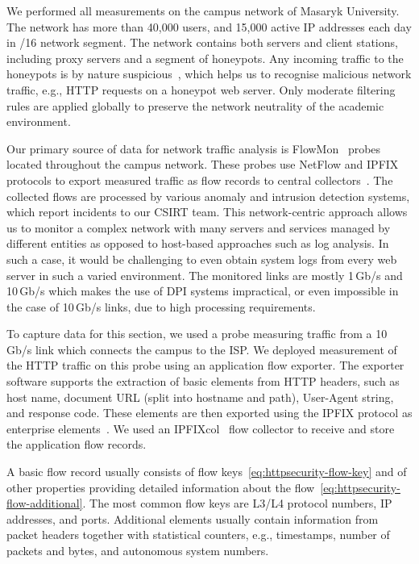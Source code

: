 We performed all measurements on the campus network of Masaryk University. The network has more than 40,000 users, and 15,000 active IP addresses each day in /16 network segment. The network contains both servers and client stations, including proxy servers and a segment of honeypots. Any incoming traffic to the honeypots is by nature suspicious~\cite{Provos-2007-Virtual}, which helps us to recognise malicious network traffic, e.g., HTTP requests on a honeypot web server. Only moderate filtering rules are applied globally to preserve the network neutrality of the academic environment.

Our primary source of data for network traffic analysis is FlowMon~\cite{FlowmonNetworks--Flowmon} probes located throughout the campus network. These probes use NetFlow and IPFIX protocols to export measured traffic as flow records to central collectors~\cite{Hofstede-2014-Flow}. The collected flows are processed by various anomaly and intrusion detection systems, which report incidents to our CSIRT team. This network-centric approach allows us to monitor a complex network with many servers and services managed by different entities as opposed to host-based approaches such as log analysis. In such a case, it would be challenging to even obtain system logs from every web server in such a varied environment. The monitored links are mostly 1\,Gb/s and 10\,Gb/s which makes the use of DPI systems impractical, or even impossible in the case of 10\,Gb/s links, due to high processing requirements.

To capture data for this section, we used a probe measuring traffic from a 10\,Gb/s link which connects the campus to the ISP. We deployed measurement of the HTTP traffic on this probe using an application flow exporter. The exporter software supports the extraction of basic elements from HTTP headers, such as host name, document URL (split into hostname and path), User-Agent string, and response code. These elements are then exported using the IPFIX protocol as enterprise elements~\cite{rfc7011}. We used an IPFIXcol~\cite{Velan-2012-Flow} flow collector to receive and store the application flow records.

A basic flow record usually consists of flow keys~\eqref{eq:httpsecurity-flow-key} and of other properties providing detailed information about the flow~\eqref{eq:httpsecurity-flow-additional}. The most common flow keys are L3/L4 protocol numbers, IP addresses, and ports. Additional elements usually contain information from packet headers together with statistical counters, e.g., timestamps, number of packets and bytes, and autonomous system numbers.

